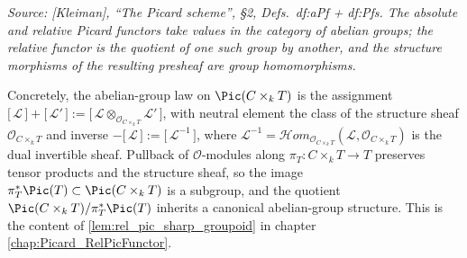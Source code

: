 \textit{Source: [Kleiman], ``The Picard scheme'', \S 2, Defs.~df:aPf + df:Pfs.
The absolute and relative Picard functors take values in the category of
abelian groups; the relative functor is the quotient of one such group by
another, and the structure morphisms of the resulting presheaf are group
homomorphisms.}

Concretely, the abelian-group law on \(\Pic(C \times_k T)\) is the assignment
\(\bigl[\,\mathcal{L}\,\bigr] + \bigl[\,\mathcal{L}'\,\bigr] :=
\bigl[\,\mathcal{L} \otimes_{\mathcal{O}_{C \times_k T}} \mathcal{L}'\,\bigr]\),
with neutral element the class of the structure sheaf
\(\mathcal{O}_{C \times_k T}\) and inverse
\(- \bigl[\,\mathcal{L}\,\bigr] := \bigl[\,\mathcal{L}^{-1}\,\bigr]\), where
\(\mathcal{L}^{-1} = \mathcal{H}om_{\mathcal{O}_{C \times_k T}}(\mathcal{L},
\mathcal{O}_{C \times_k T})\) is the dual invertible sheaf. Pullback of
\(\mathcal{O}\)-modules along \(\pi_T : C \times_k T \to T\) preserves tensor
products and the structure sheaf, so the image
\(\pi_T^* \Pic(T) \subset \Pic(C \times_k T)\) is a subgroup, and the quotient
\(\Pic(C \times_k T) / \pi_T^* \Pic(T)\) inherits a canonical abelian-group
structure. This is the content of
\cref{lem:rel_pic_sharp_groupoid} in chapter \cref{chap:Picard_RelPicFunctor}.

